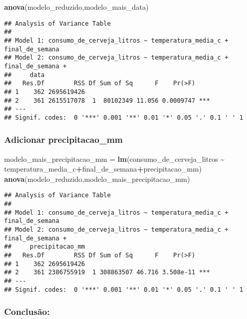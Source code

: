 \documentclass[
]{article}
\newenvironment{Shaded}{\begin{snugshade}}{\end{snugshade}}
\newcommand{\FunctionTok}[1]{\textcolor[rgb]{0.13,0.29,0.53}{\textbf{#1}}}
\newcommand{\NormalTok}[1]{#1}
\newcommand{\OtherTok}[1]{\textcolor[rgb]{0.56,0.35,0.01}{#1}}
\newcommand{\SpecialCharTok}[1]{\textcolor[rgb]{0.81,0.36,0.00}{\textbf{#1}}}
\begin{document}
\begin{Shaded}
\begin{Highlighting}[]
\FunctionTok{anova}\NormalTok{(modelo\_reduzido,modelo\_mais\_data)}
\end{Highlighting}
\end{Shaded}

\begin{verbatim}
## Analysis of Variance Table
## 
## Model 1: consumo_de_cerveja_litros ~ temperatura_media_c + final_de_semana
## Model 2: consumo_de_cerveja_litros ~ temperatura_media_c + final_de_semana + 
##     data
##   Res.Df        RSS Df Sum of Sq      F    Pr(>F)    
## 1    362 2695619426                                  
## 2    361 2615517078  1  80102349 11.056 0.0009747 ***
## ---
## Signif. codes:  0 '***' 0.001 '**' 0.01 '*' 0.05 '.' 0.1 ' ' 1
\end{verbatim}

\hypertarget{adicionar-precipitacao_mm-1}{%
\subsubsection{Adicionar
precipitacao\_mm}\label{adicionar-precipitacao_mm-1}}

\begin{Shaded}
\begin{Highlighting}[]
\NormalTok{modelo\_mais\_precipitacao\_mm }\OtherTok{=} \FunctionTok{lm}\NormalTok{(consumo\_de\_cerveja\_litros }\SpecialCharTok{\textasciitilde{}} 
\NormalTok{                                temperatura\_media\_c}\SpecialCharTok{+}\NormalTok{final\_de\_semana}\SpecialCharTok{+}\NormalTok{precipitacao\_mm)}
\FunctionTok{anova}\NormalTok{(modelo\_reduzido,modelo\_mais\_precipitacao\_mm)}
\end{Highlighting}
\end{Shaded}

\begin{verbatim}
## Analysis of Variance Table
## 
## Model 1: consumo_de_cerveja_litros ~ temperatura_media_c + final_de_semana
## Model 2: consumo_de_cerveja_litros ~ temperatura_media_c + final_de_semana + 
##     precipitacao_mm
##   Res.Df        RSS Df Sum of Sq      F    Pr(>F)    
## 1    362 2695619426                                  
## 2    361 2386755919  1 308863507 46.716 3.508e-11 ***
## ---
## Signif. codes:  0 '***' 0.001 '**' 0.01 '*' 0.05 '.' 0.1 ' ' 1
\end{verbatim}

\hypertarget{conclusuxe3o-5}{%
\subsubsection{Conclusão:}\label{conclusuxe3o-5}}
\end{document}
